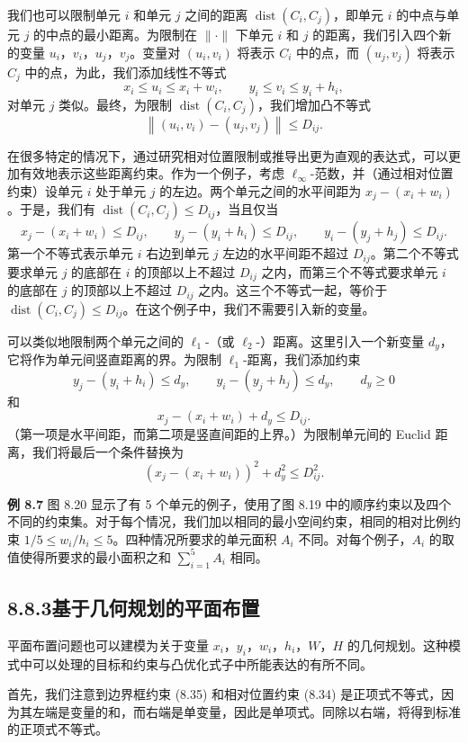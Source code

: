 \documentclass[UTF8, 12pt, fontset=fandol, oneside]{ctexart}
\begin{document}
我们也可以限制单元 $i$ 和单元 $j$ 之间的距离 $\operatorname{dist}(C_i,C_j)$，即单元 $i$ 的中点与单元 $j$ 的中点的最小距离。为限制在 $\|\cdot\|$ 下单元 $i$ 和 $j$ 的距离，我们引入四个新的变量 $u_i$，$v_i$，$u_j$，$v_j$。变量对 $(u_i,v_i)$ 将表示 $C_i$ 中的点，而 $(u_j,v_j)$ 将表示 $C_j$ 中的点，为此，我们添加线性不等式
\[
x_i\leq u_i\leq x_i+w_i,\qquad y_i\leq v_i\leq y_i+h_i,
\]
对单元 $j$ 类似。最终，为限制 $\operatorname{dist}(C_i,C_j)$，我们增加凸不等式
\[
\left\|(u_i,v_i)-(u_j,v_j)\right\|\leq D_{ij}.
\]

在很多特定的情况下，通过研究相对位置限制或推导出更为直观的表达式，可以更加有效地表示这些距离约束。作为一个例子，考虑 $\ell_\infty$-范数，并（通过相对位置约束）设单元 $i$ 处于单元 $j$ 的左边。两个单元之间的水平间距为 $x_j-(x_i+w_i)$。于是，我们有 $\operatorname{dist}(C_i,C_j)\leq D_{ij}$，当且仅当
\[
x_j-(x_i+w_i)\leq D_{ij},\qquad y_j-(y_i+h_i)\leq D_{ij},\qquad y_i-(y_j+h_j)\leq D_{ij}.
\]
第一个不等式表示单元 $i$ 右边到单元 $j$ 左边的水平间距不超过 $D_{ij}$。第二个不等式要求单元 $j$ 的底部在 $i$ 的顶部以上不超过 $D_{ij}$ 之内，而第三个不等式要求单元 $i$ 的底部在 $j$ 的顶部以上不超过 $D_{ij}$ 之内。这三个不等式一起，等价于 $\operatorname{dist}(C_i,C_j)\leq D_{ij}$。在这个例子中，我们不需要引入新的变量。

可以类似地限制两个单元之间的 $\ell_1$-（或 $\ell_2$-）距离。这里引入一个新变量 $d_y$，它将作为单元间竖直距离的界。为限制 $\ell_1$-距离，我们添加约束
\[
y_j-(y_i+h_i)\leq d_y,\qquad y_i-(y_j+h_j)\leq d_y,\qquad d_y\geq 0
\]
和
\[
x_j-(x_i+w_i)+d_y\leq D_{ij}.
\]
（第一项是水平间距，而第二项是竖直间距的上界。）为限制单元间的 Euclid 距离，我们将最后一个条件替换为
\[
\left(x_j-(x_i+w_i)\right)^2+d_y^2\leq D_{ij}^2.
\]

\noindent\textbf{例 8.7}
图 8.20 显示了有 5 个单元的例子，使用了图 8.19 中的顺序约束以及四个不同的约束集。对于每个情况，我们加以相同的最小空间约束，相同的相对比例约束 $1/5\leq w_i/h_i\leq 5$。四种情况所要求的单元面积 $A_i$ 不同。对每个例子，$A_i$ 的取值使得所要求的最小面积之和 $\sum_{i=1}^5A_i$ 相同。

\subsection*{8.8.3\quad 基于几何规划的平面布置}

平面布置问题也可以建模为关于变量 $x_i$，$y_i$，$w_i$，$h_i$，$W$，$H$ 的几何规划。这种模式中可以处理的目标和约束与凸优化式子中所能表达的有所不同。

首先，我们注意到边界框约束 (8.35) 和相对位置约束 (8.34) 是正项式不等式，因为其左端是变量的和，而右端是单变量，因此是单项式。同除以右端，将得到标准的正项式不等式。
\end{document}
